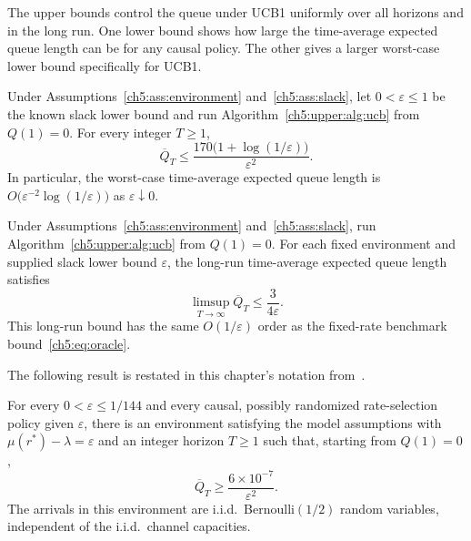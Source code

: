 The upper bounds control the queue under UCB1 uniformly over all horizons
and in the long run. One lower bound shows how large the time-average
expected queue length can be for any causal policy. The other gives a
larger worst-case lower bound specifically for UCB1.

\begin{Thm:Theorem}
\label{ch5:upper:thm:main}
Under Assumptions~\ref{ch5:ass:environment} and~\ref{ch5:ass:slack},
let $0<\varepsilon\le1$ be the known slack lower bound and run
Algorithm~\ref{ch5:upper:alg:ucb} from $Q(1)=0$.
For every integer $T\ge1$,
\begin{equation}
 \overline Q_T
 \le \frac{170\bigl(1+\log(1/\varepsilon)\bigr)}{\varepsilon^2}.
 \label{ch5:upper:eq:uniform-bound}
\end{equation}
In particular, the worst-case time-average expected queue length is
$O\bigl(\varepsilon^{-2}\log(1/\varepsilon)\bigr)$ as $\varepsilon\downarrow0$.
\end{Thm:Theorem}

\begin{Thm:Remark}
\label{ch5:upper:rem:long-run}
Under Assumptions~\ref{ch5:ass:environment} and~\ref{ch5:ass:slack}, run
Algorithm~\ref{ch5:upper:alg:ucb} from $Q(1)=0$.
For each fixed environment and supplied slack lower bound $\varepsilon$, the
long-run time-average expected queue length satisfies
\begin{equation}
 \limsup_{T\to\infty}\overline Q_T
 \le\frac3{4\varepsilon}.
 \label{ch5:upper:eq:long-run-bound}
\end{equation}
This long-run bound has the same $O(1/\varepsilon)$ order as the
fixed-rate benchmark bound~\eqref{ch5:eq:oracle}.
\end{Thm:Remark}

The following result is restated in this chapter's notation
from~\cite[Theorem~2]{wijewardena2026banditbased}.

\begin{Thm:Theorem}
\label{ch5:lower:theorem}
For every $0<\varepsilon\le1/144$ and every causal, possibly randomized
rate-selection policy given $\varepsilon$, there is an environment
satisfying the model assumptions with $\mu(r^*)-\lambda=\varepsilon$ and
an integer horizon $T\ge1$ such that, starting from $Q(1)=0$,
\begin{equation}
 \overline Q_T
 \ge\frac{6\times10^{-7}}{\varepsilon^2}.
 \label{ch5:lower:main-bound}
\end{equation}
The arrivals in this environment are i.i.d.\ Bernoulli$(1/2)$ random
variables, independent of the i.i.d.\ channel capacities.
\end{Thm:Theorem}

